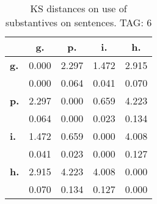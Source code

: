 \begin{table}[h!]
\begin{center}
\begin{tabular}{| l || c | c | c | c |}\hline
 & {\bf g.} & {\bf p.} & {\bf i.} & {\bf h.} \\\hline\hline
{\bf g.} & 0.000 & 2.297 & 1.472 & 2.915 \\
{\bf } & 0.000 & 0.064 & 0.041 & 0.070 \\\hline
{\bf p.} & 2.297 & 0.000 & 0.659 & 4.223 \\
{\bf } & 0.064 & 0.000 & 0.023 & 0.134 \\\hline
{\bf i.} & 1.472 & 0.659 & 0.000 & 4.008 \\
{\bf } & 0.041 & 0.023 & 0.000 & 0.127 \\\hline
{\bf h.} & 2.915 & 4.223 & 4.008 & 0.000 \\
{\bf } & 0.070 & 0.134 & 0.127 & 0.000 \\\hline
\end{tabular}
\caption{KS distances on use of substantives on sentences. TAG: 6}
\end{center}
\end{table}